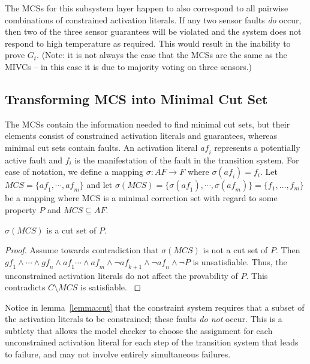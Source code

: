 The MCSs for this subsystem layer happen to also correspond to all pairwise combinations of constrained activation literals. If any two sensor faults {\em do} occur, then two of the three sensor guarantees will be violated and the system does not respond to high temperature as required. This would result in the inability to prove $G_t$. (Note: it is not always the case that the MCSs are the same as the MIVCs -- in this case it is due to majority voting on three sensors.)

\subsection{Transforming MCS into Minimal Cut Set}
The MCSs contain the information needed to find minimal cut sets, but their elements consist of constrained activation literals and guarantees, whereas minimal cut sets contain faults. An activation literal $\mathit{af}_i$ represents a potentially active fault and $f_i$ is the manifestation of the fault in the transition system. For ease of notation, we define a mapping $\sigma : AF \rightarrow F$ where $\sigma (\mathit{af}_i) = f_i$. Let $MCS = \{\mathit{af}_1, \cdots, \mathit{af}_m\}$ and let $\sigma (MCS) = \{\sigma (\mathit{af}_{1}), \cdots, \sigma (\mathit{af}_{m})\} = \{f_1, \dots, f_m\}$ be a mapping where MCS is a minimal correction set with regard to some property $P$ and $MCS  \subseteq AF$. 

\begin{lemma} $\sigma (MCS)$ is a cut set of $P$. 
\begin{proof}
Assume towards contradiction that $\sigma (MCS)$ is not a cut set of $P$. Then $\mathit{gf}_1 \land \cdots \land \mathit{gf}_n \land \mathit{af}_1 \cdots \land \mathit{af}_m \land \neg \mathit{af}_{k+1} \land \neg \mathit{af}_n \land \neg P$ is unsatisfiable. Thus, the unconstrained activation literals do not affect the provability of $P$. This contradicts $C \setminus MCS$ is satisfiable. 
\label{lemma:cut}
\end{proof}
\end{lemma}

Notice in lemma~\ref{lemma:cut} that the constraint system requires that a subset of the activation literals to be constrained; these faults \textit{do not} occur. This is a subtlety that allows the model checker to choose the assignment for each unconstrained activation literal for each step of the transition system that leads to failure, and may not involve entirely simultaneous failures.

